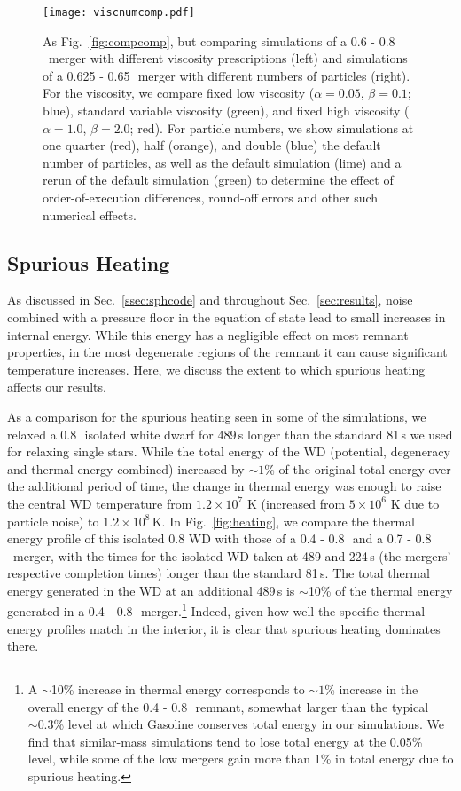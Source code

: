 \begin{figure}
\centering
\texttt{[image: viscnumcomp.pdf]}
\caption{As Fig.~\ref{fig:compcomp}, but comparing simulations of a 0.6 - 0.8\,\Msun\ merger with different viscosity prescriptions (left) and simulations of a 0.625 - 0.65\,\Msun\ merger with different numbers of particles (right).  For the viscosity, we compare fixed low viscosity ($\alpha=0.05$, $\beta=0.1$; blue), standard variable viscosity (green), and fixed high viscosity ($\alpha=1.0$, $\beta=2.0$; red).  For particle numbers, we show simulations at one quarter (red), half (orange), and double (blue) the default number of particles, as well as the default simulation (lime) and a rerun of the default simulation (green) to determine the effect of order-of-execution differences, round-off errors and other such numerical effects.}
\label{fig:viscnumcomp}
\end{figure}

\subsection{Spurious Heating}
\label{ssec:spheat}

As discussed in Sec.~\ref{ssec:sphcode} and throughout Sec.~\ref{sec:results}, noise combined with a pressure floor in the equation of state lead to small increases in internal energy.  While this energy has a negligible effect on most remnant properties, in the most degenerate regions of the remnant it can cause significant temperature increases.  Here, we discuss the extent to which spurious heating affects our results.

As a comparison for the spurious heating seen in some of the simulations, we relaxed a 0.8\,\Msun\ isolated white dwarf for $489\,$s longer than the standard 81\,s we used for relaxing single stars.  While the total energy of the WD (potential, degeneracy and thermal energy combined) increased by $\sim\!1$\% of the original total energy over the additional period of time, the change in thermal energy was enough to raise the central WD temperature from $1.2\times 10^7$ K (increased from $5\times 10^6$ K due to particle noise) to $1.2\times 10^8\,$K.  In Fig.~\ref{fig:heating}, we compare the thermal energy profile of this isolated 0.8 {\Msun} WD with those of a 0.4 - 0.8\,\Msun\ and a 0.7 - 0.8\,\Msun\ merger, with the times for the isolated WD taken at 489 and 224\,s (the mergers' respective completion times) longer than the standard 81\,s.  The total thermal energy generated in the WD at an additional 489\,s is $\sim$10\% of the thermal energy generated in a 0.4 - 0.8\,\Msun\ merger.\footnote{A $\sim$10\% increase in thermal energy corresponds to $\sim\!1$\% increase in the overall energy of the 0.4 - 0.8\,\Msun\ remnant, somewhat larger than the typical $\sim\!0.3$\% level at which Gasoline conserves total energy in our simulations.  We find that similar-mass simulations tend to lose total energy at the 0.05\% level, while some of the low {\qrho} mergers gain more than 1\% in total energy due to spurious heating.}  Indeed, given how well the specific thermal energy profiles match in the interior, it is clear that spurious heating dominates there.  

